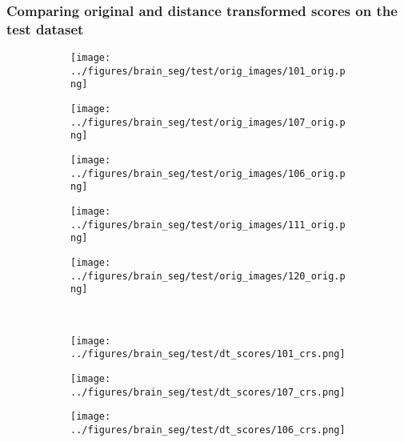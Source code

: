 \subsubsection{Comparing original and distance transformed scores on the test dataset}\label{braintest}
	\begin{figure}[h!] %
	\centering
	\begin{subfigure}{0.16\textwidth}
		\centering
		\texttt{[image: ../figures/brain\_seg/test/orig\_images/101\_orig.png]}
		\label{fig:1}
	\end{subfigure}
	\begin{subfigure}{0.16\textwidth}
		\centering
		\texttt{[image: ../figures/brain\_seg/test/orig\_images/107\_orig.png]}
		\label{fig:2}
	\end{subfigure}
	\begin{subfigure}{0.16\textwidth}
		\centering
		\texttt{[image: ../figures/brain\_seg/test/orig\_images/106\_orig.png]}
		\label{fig:3}
	\end{subfigure}
	\begin{subfigure}{0.16\textwidth}
		\centering
		\texttt{[image: ../figures/brain\_seg/test/orig\_images/111\_orig.png]}
		\label{fig:4}
	\end{subfigure}
			\begin{subfigure}{0.16\textwidth}
					\centering
					\texttt{[image: ../figures/brain\_seg/test/orig\_images/120\_orig.png]}
					\label{fig:5}
				\end{subfigure}
		\\
	\vspace{-0.35cm}
	\begin{subfigure}{0.16\textwidth}
		\centering
		\texttt{[image: ../figures/brain\_seg/test/dt\_scores/101\_crs.png]}
		\label{fig:6}
	\end{subfigure}
	\begin{subfigure}{0.16\textwidth}
		\centering
		\texttt{[image: ../figures/brain\_seg/test/dt\_scores/107\_crs.png]}
		\label{fig:7}
	\end{subfigure}
	\begin{subfigure}{0.16\textwidth}
		\centering
		\texttt{[image: ../figures/brain\_seg/test/dt\_scores/106\_crs.png]}
		\label{fig:8}
	\end{subfigure}

\end{figure}

